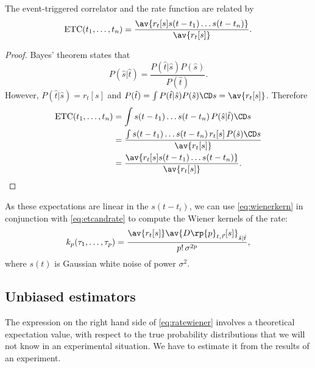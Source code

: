 \documentclass[12pt]{article}
\DeclareMathOperator{\ETC}{ETC}
\begin{document}
\begin{thm}
  The event-triggered correlator and the rate function are related by
  \begin{equation}\label{eq:etcandrate}
    \ETC(t_1,\ldots,t_n) = \frac{\av{r_t[s]s(t-t_1)\ldots s(t-t_n)}}{\av{r_t[s]}}.
  \end{equation}
\end{thm}
\begin{proof}
  Bayes' theorem states that
  \begin{equation}\label{eq:bayes}
    P(\hat{s}|\hat{t}) = \frac{P(\hat{t}|\hat{s})P(\hat{s})}{P(\hat{t})}.
  \end{equation}
  However, $P(\hat{t}|\hat{s})=r_t[s]$ and $P(\hat{t})=\int P(\hat{t}|\hat{s})P(\hat{s})\CD s = \av{r_t[s]}$.
  Therefore
  \begin{equation}\label{eq:pfetcandrate}
    \begin{aligned}
      \ETC(t_1,\ldots,t_n) &= \int s(t-t_1)\ldots s(t-t_n) \, P(\hat{s}|\hat{t})\CD s\\
        &= \frac{\int s(t-t_1)\ldots s(t-t_n) \, r_t[s]\,P(\hat{s})\CD s }{ \av{r_t[s]} }\\
        &= \frac{\av{r_t[s]s(t-t_1)\ldots s(t-t_n)}}{\av{r_t[s]}}.
    \end{aligned}
  \end{equation}
\end{proof}

As these expectations are linear in the $s(t-t_i)$, we can use \eqref{eq:wienerkern} in conjunction with \eqref{eq:etcandrate} to compute the Wiener kernels of the rate:
%
\begin{equation}\label{eq:ratewiener}
  k_p(\tau_1,\ldots,\tau_p) = \frac{ \av{r_t[s]} \av{D\rp{p}_{t,\vec{\tau}}[s]}_{\hat{s}|\hat{t}} }{ p! \, \sigma^{2p} },
\end{equation}
%
where $s(t)$ is Gaussian white noise of power $\sigma^2$.


\subsection{Unbiased estimators}\label{sec:poissonest}

The expression on the right hand side of \eqref{eq:ratewiener} involves a theoretical expectation value, with respect to the true probability distributions that we will not know in an experimental situation.
We have to estimate it from the results of an experiment.
\end{document}

